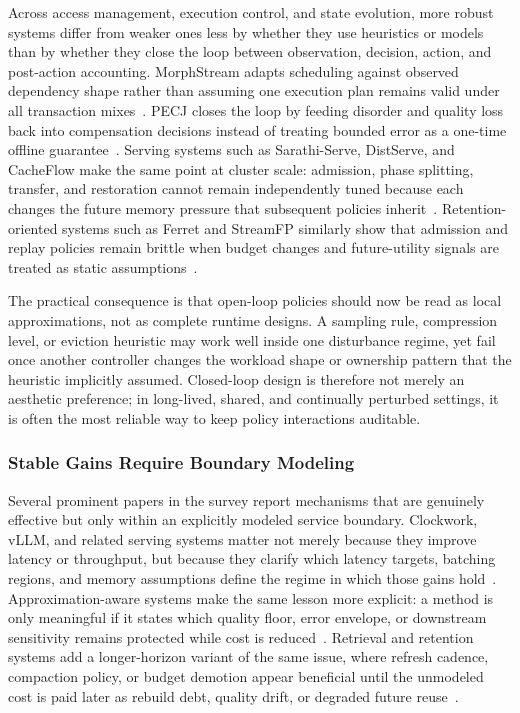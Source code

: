 \documentclass[acmsmall,screen,review]{acmart}
\begin{document}
Across access management, execution control, and state evolution, more robust systems differ from weaker ones less by whether they use heuristics or models than by whether they close the loop between observation, decision, action, and post-action accounting. MorphStream adapts scheduling against observed dependency shape rather than assuming one execution plan remains valid under all transaction mixes~\cite{mao2023morphstream}. PECJ closes the loop by feeding disorder and quality loss back into compensation decisions instead of treating bounded error as a one-time offline guarantee~\cite{zeng2024pecj}. Serving systems such as Sarathi-Serve, DistServe, and CacheFlow make the same point at cluster scale: admission, phase splitting, transfer, and restoration cannot remain independently tuned because each changes the future memory pressure that subsequent policies inherit~\cite{agrawal2024sarathi,zhong2024distserve,nian2026cacheflow}. Retention-oriented systems such as Ferret and StreamFP similarly show that admission and replay policies remain brittle when budget changes and future-utility signals are treated as static assumptions~\cite{zhou2025ferret,li2026streamfp}.

The practical consequence is that open-loop policies should now be read as local approximations, not as complete runtime designs. A sampling rule, compression level, or eviction heuristic may work well inside one disturbance regime, yet fail once another controller changes the workload shape or ownership pattern that the heuristic implicitly assumed. Closed-loop design is therefore not merely an aesthetic preference; in long-lived, shared, and continually perturbed settings, it is often the most reliable way to keep policy interactions auditable.

\subsubsection{Stable Gains Require Boundary Modeling}

Several prominent papers in the survey report mechanisms that are genuinely effective but only within an explicitly modeled service boundary. Clockwork, vLLM, and related serving systems matter not merely because they improve latency or throughput, but because they clarify which latency targets, batching regions, and memory assumptions define the regime in which those gains hold~\cite{gujarati2020clockwork,kwon2023pagedattention}. Approximation-aware systems make the same lesson more explicit: a method is only meaningful if it states which quality floor, error envelope, or downstream sensitivity remains protected while cost is reduced~\cite{zeng2024pecj,zeng2024libamm}. Retrieval and retention systems add a longer-horizon variant of the same issue, where refresh cadence, compaction policy, or budget demotion appear beneficial until the unmodeled cost is paid later as rebuild debt, quality drift, or degraded future reuse~\cite{wang2026candor,zhang2026flowrag,zhou2025ferret}.
\end{document}
